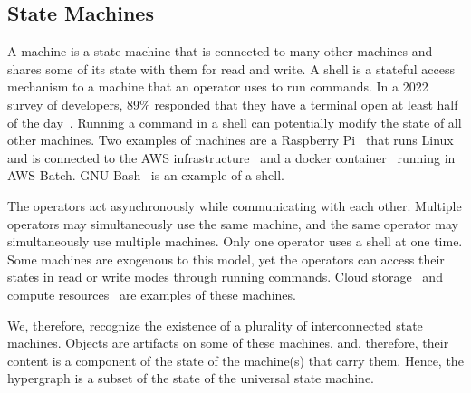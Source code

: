 \subsection{State Machines}

A machine is a state machine that is connected to many other machines and shares some of its state with them for read and write. A shell is a stateful access mechanism to a machine that an operator uses to run commands. In a 2022 survey of developers, 89\% responded that they have a terminal open at least half of the day~\cite{textualize_founded}. Running a command in a shell can potentially modify the state of all other machines. Two examples of machines are a Raspberry Pi~\cite{rpi} that runs Linux and is connected to the AWS infrastructure~\cite{aws} and a docker container~\cite{docker} running in AWS Batch. GNU Bash~\cite{gnu_bash} is an example of a shell.

The operators act asynchronously while communicating with each other. Multiple operators may simultaneously use the same machine, and the same operator may simultaneously use multiple machines. Only one operator uses a shell at one time. Some machines are exogenous to this model, yet the operators can access their states in read or write modes through running commands. Cloud storage~\cite{aws_s3} and compute resources~\cite{aws_batch} are examples of these machines.

We, therefore, recognize the existence of a plurality of interconnected state machines. Objects are artifacts on some of these machines, and, therefore, their content is a component of the state of the machine(s) that carry them. Hence, the hypergraph is a subset of the state of the universal state machine.